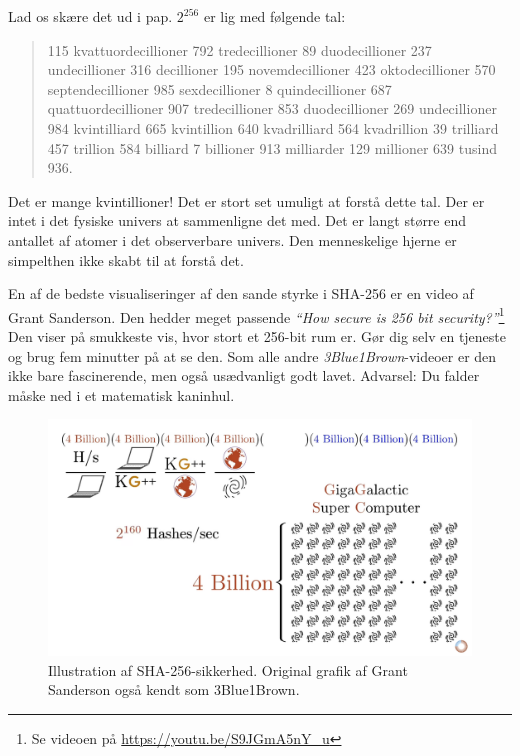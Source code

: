 \documentclass[paper=6in:9in,pagesize=pdftex,headinclude=on,footinclude=on,12pt]{scrbook}
\begin{document}
Lad os skære det ud i pap. $2^{256}$ er lig med følgende tal:\begin{quotation}\begin{samepage} 115 kvattuordecillioner 792 tredecillioner 89 duodecillioner 237 undecillioner 316 decillioner 195 novemdecillioner 423 oktodecillioner 570 septendecillioner 985 sexdecillioner 8 quindecillioner 687 quattuordecillioner 907 tredecillioner 853 duodecillioner 269 undecillioner 984 kvintilliard 665 kvintillion 640 kvadrilliard 564 kvadrillion 39 trilliard 457 trillion 584 billiard 7 billioner 913 milliarder 129 millioner 639 tusind 936. \end{samepage}\end{quotation}

Det er mange kvintillioner! Det er stort set umuligt at forstå dette tal. Der er intet i det fysiske univers at sammenligne det med. Det er langt større end antallet af atomer i det observerbare univers. Den menneskelige hjerne er simpelthen ikke skabt til at forstå det.\newpage

En af de bedste visualiseringer af den sande styrke i SHA-256 er en video af Grant Sanderson. Den hedder meget passende \textit{\enquote{How secure is 256 bit security?}}\footnote{Se videoen på \url{https://youtu.be/S9JGmA5nY_u}} Den viser på smukkeste vis, hvor stort et 256-bit rum er. Gør dig selv en tjeneste og brug fem minutter på at se den. Som alle andre \textit{3Blue1Brown}-videoer er den ikke bare fascinerende, men også usædvanligt godt lavet. Advarsel: Du falder måske ned i et matematisk kaninhul.\begin{figure}
  \includegraphics{assets/images/youtube-vid-inverted.png}
  \caption{Illustration af SHA-256-sikkerhed. Original grafik af Grant Sanderson også kendt som 3Blue1Brown.}
  \label{fig:youtube-vid-inverted}
\end{figure}
\end{document}
